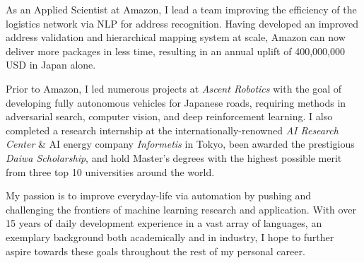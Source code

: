 

\begin{cvparagraph}

As an Applied Scientist at Amazon, I lead a team improving the efficiency of the logistics network via NLP for address recognition. Having developed an improved address validation and hierarchical mapping system at scale, Amazon can now deliver more packages in less time, resulting in an annual uplift of 400,000,000 USD in Japan alone.

Prior to Amazon, I led numerous projects at \emph{Ascent Robotics} with the goal of developing fully autonomous vehicles for Japanese roads, requiring methods in adversarial search, computer vision, and deep reinforcement learning. I also completed a research internship at the internationally-renowned \emph{AI Research Center} \& AI energy company \emph{Informetis} in Tokyo, been awarded the prestigious \emph{Daiwa Scholarship}, and hold Master's degrees with the highest possible merit from three top 10 universities around the world.

My passion is to improve everyday-life via automation by pushing and challenging the frontiers of machine learning research and application. With over 15 years of daily development experience in a vast array of languages, an exemplary background both academically and in industry, I hope to further aspire towards these goals throughout the rest of my personal career.



\end{cvparagraph}
